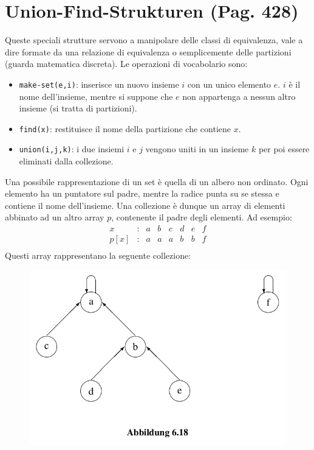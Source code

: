 \documentclass[a4paper]{book}
\newcommand{\inline}[1]{\lstinline!#1!}%
\begin{document}
\section{Union-Find-Strukturen (Pag. 428)}
Queste speciali strutture servono a manipolare delle classi di equivalenza, vale a dire formate da una relazione di equivalenza o semplicemente delle partizioni (guarda matematica discreta). Le operazioni di vocabolario sono:
\begin{itemize}
\item \inline{make-set(e,i)}: inserisce un nuovo insieme $i$ con un unico elemento $e$. $i$ è il nome dell'insieme, mentre si suppone che $e$ non appartenga a nessun altro insieme (si tratta di partizioni).
\item \inline{find(x)}: restituisce il nome della partizione che contiene $x$.
\item \inline{union(i,j,k)}: i due insiemi $i$ e $j$ vengono uniti in un insieme $k$ per poi essere eliminati dalla collezione.
\end{itemize}
Una possibile rappresentazione di un set è quella di un albero non ordinato. Ogni elemento ha un puntatore sul padre, mentre la radice punta su se stessa e contiene il nome dell'insieme. Una collezione è dunque un array di elementi abbinato ad un altro array $p$, contenente il padre degli elementi. Ad esempio:
\[\begin{array}{*{20}{c}}
{x}&{:}&a&{b}&{c}&d&e&f\\
{p[x]}&{:}&{a}&{a}&{a}&{b}&b&f\\
\end{array}\]
Questi array rappresentano la seguente collezione:
\begin{figure}[H]
\centering
\includegraphics[scale=0.4]{Figures/ufs.png}
\end{figure}
\end{document}
